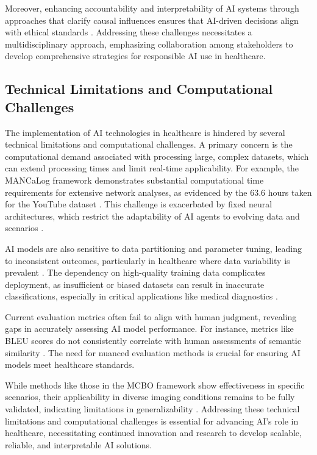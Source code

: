 Moreover, enhancing accountability and interpretability of AI systems through approaches that clarify causal influences ensures that AI-driven decisions align with ethical standards \cite{sen2018supervisingfeatureinfluence}. Addressing these challenges necessitates a multidisciplinary approach, emphasizing collaboration among stakeholders to develop comprehensive strategies for responsible AI use in healthcare.

\subsection{Technical Limitations and Computational Challenges} \label{subsec:Technical Limitations and Computational Challenges}

The implementation of AI technologies in healthcare is hindered by several technical limitations and computational challenges. A primary concern is the computational demand associated with processing large, complex datasets, which can extend processing times and limit real-time applicability. For example, the MANCaLog framework demonstrates substantial computational time requirements for extensive network analyses, as evidenced by the 63.6 hours taken for the YouTube dataset \cite{shakarian2022reasoningcomplexnetworkslogic}. This challenge is exacerbated by fixed neural architectures, which restrict the adaptability of AI agents to evolving data and scenarios \cite{le2019evolvingselfsupervisedneuralnetworks}.

AI models are also sensitive to data partitioning and parameter tuning, leading to inconsistent outcomes, particularly in healthcare where data variability is prevalent \cite{stogin2022provablystableneuralnetwork}. The dependency on high-quality training data complicates deployment, as insufficient or biased datasets can result in inaccurate classifications, especially in critical applications like medical diagnostics \cite{tumer1999ensemblesradialbasisfunction}.

Current evaluation metrics often fail to align with human judgment, revealing gaps in accurately assessing AI model performance. For instance, metrics like BLEU scores do not consistently correlate with human assessments of semantic similarity \cite{yamshchikov2020styletransferparaphraselookingsensible}. The need for nuanced evaluation methods is crucial for ensuring AI models meet healthcare standards.

While methods like those in the MCBO framework show effectiveness in specific scenarios, their applicability in diverse imaging conditions remains to be fully validated, indicating limitations in generalizability \cite{wang2024unsupervisedmultimodal3dmedical}. Addressing these technical limitations and computational challenges is essential for advancing AI's role in healthcare, necessitating continued innovation and research to develop scalable, reliable, and interpretable AI solutions.

